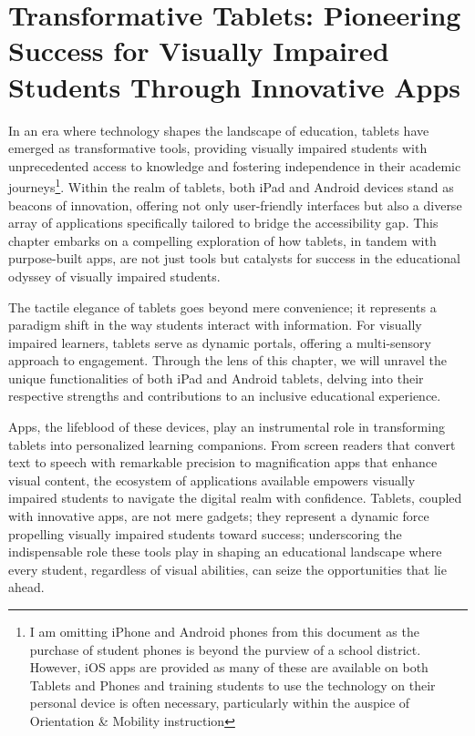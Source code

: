 \documentclass[12pt,letterpaper,twoside]{extreport}
\begin{document}
\cleardoublepage \hypertarget{ios-devices}{}\chapter[\raggedright Transformative Tablets: \\Pioneering Success for Visually Impaired Students Through \\Innovative Apps]{Transformative Tablets: Pioneering Success for Visually Impaired Students Through Innovative Apps}\label{ios-devices}
\minitoc \newpage
{}
In an era where technology shapes the landscape of education, tablets have emerged as transformative tools, providing visually impaired students with unprecedented access to knowledge and fostering independence in their academic journeys\footnote{\raggedright I am omitting iPhone and Android phones from this document as the purchase of student phones is beyond the purview of a school district. However, iOS apps are provided as many of these are available on both Tablets and Phones and training students to use the technology on their personal device is often necessary, particularly within the auspice of Orientation \& Mobility instruction}. Within the realm of tablets, both iPad and Android devices stand as beacons of innovation, offering not only user-friendly interfaces but also a diverse array of applications specifically tailored to bridge the accessibility gap. This chapter embarks on a compelling exploration of how tablets, in tandem with purpose-built apps, are not just tools but catalysts for success in the educational odyssey of visually impaired students.

The tactile elegance of tablets goes beyond mere convenience; it represents a paradigm shift in the way students interact with information. For visually impaired learners, tablets serve as dynamic portals, offering a multi-sensory approach to engagement. Through the lens of this chapter, we will unravel the unique functionalities of both iPad and Android tablets, delving into their respective strengths and contributions to an inclusive educational experience.

Apps, the lifeblood of these devices, play an instrumental role in transforming tablets into personalized learning companions. From screen readers that convert text to speech with remarkable precision to magnification apps that enhance visual content, the ecosystem of applications available empowers visually impaired students to navigate the digital realm with confidence. Tablets, coupled with innovative apps, are not mere gadgets; they represent a dynamic force propelling visually impaired students toward success; underscoring the indispensable role these tools play in shaping an educational landscape where every student, regardless of visual abilities, can seize the opportunities that lie ahead.
\end{document}
